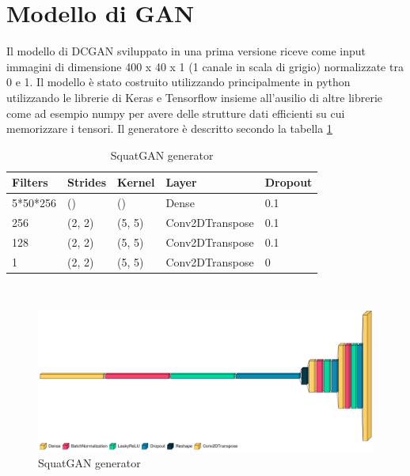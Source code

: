\section{Modello di GAN}
Il modello di DCGAN sviluppato in una prima versione riceve come input immagini di dimensione 400 x 40 x 1 (1 canale in scala di grigio) normalizzate tra 0 e 1.
Il modello è stato costruito utilizzando principalmente in python utilizzando le librerie di Keras e Tensorflow insieme all'ausilio di altre librerie come ad esempio numpy per avere delle strutture dati efficienti su cui memorizzare i tensori.
Il generatore è descritto secondo la tabella \ref{table:generator}\\
\begin{table}[!h]
    \centering
    \begin{tabular}{|l|l|l|l|l|}
    \hline
    Filters  & Strides & Kernel & Layer           & Dropout \\ \hline
    5*50*256 & ()      & ()     & Dense           & 0.1     \\
    256      & (2, 2)  & (5, 5) & Conv2DTranspose & 0.1     \\
    128      & (2, 2)  & (5, 5) & Conv2DTranspose & 0.1     \\
    1        & (2, 2)  & (5, 5) & Conv2DTranspose & 0       \\
    \hline
    \end{tabular}
    \caption{SquatGAN generator}
    \label{table:generator}
\end{table}\\
\begin{figure}[!h]
  \centering
  \begin{minipage}[b]{\textwidth}
    \includegraphics[width=\textwidth]{pictures/generator.png}
    \caption{SquatGAN generator}
  \end{minipage}
  \label{fig:arch}
  \hfill
\end{figure}
